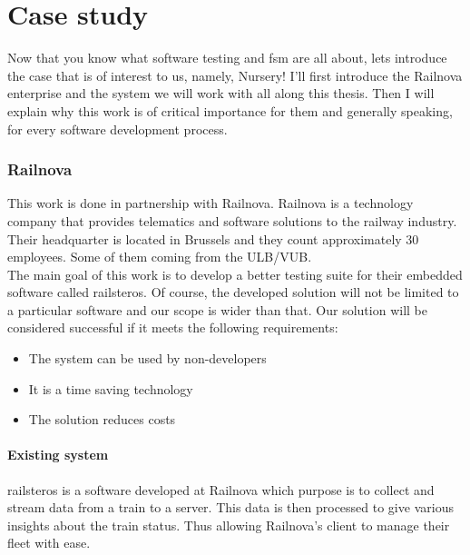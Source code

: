 \documentclass[12pt]{article}
\theoremstyle{definition}
\theoremstyle{definition}
\theoremstyle{remark}
\begin{document}
\clearpage
\part{Case study}

Now that you know what software testing and \gls{fsm} are all about, lets introduce the case that is of interest to us, namely, Nursery! I'll first introduce the Railnova enterprise and the system we will work with all along this thesis. Then I will explain why this work is of critical importance for them and generally speaking, for every software development process.

\clearpage



\section{Railnova}


This work is done in partnership with Railnova. Railnova is a technology company that provides telematics and software solutions to the railway industry. Their headquarter is located in Brussels and they count approximately 30 employees. Some of them coming from the ULB/VUB.\\

The main goal of this work is to develop a better testing suite for their embedded software called \gls{railsteros}. Of course, the developed solution will not be limited to a particular software and our scope is wider than that. Our solution will be considered successful if it meets the following requirements:

\begin{itemize}
\item The system can be used by non-developers
\item It is a time saving technology
\item The solution reduces costs
\end{itemize}


\subsection{Existing system}

\gls{railsteros} is a software developed at Railnova which purpose is to collect and stream data from a train to a server. This data is then processed to give various insights about the train status. Thus allowing Railnova's client to manage their fleet with ease.\\
\end{document}
